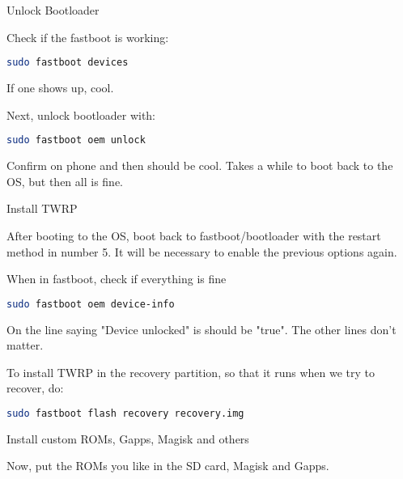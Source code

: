 \vspace{.5cm}
{\Large {} Unlock Bootloader}
\par Check if the fastboot is working:
\begin{lstlisting}[language=bash]
    sudo fastboot devices
\end{lstlisting}
\par If one shows up, cool. 

\par Next, unlock bootloader with:
\begin{lstlisting}[language=bash]
    sudo fastboot oem unlock
\end{lstlisting}

\par Confirm on phone and then should be cool. Takes a while to boot back to the OS, but then all is fine.

\vspace{.5cm}
{\Large {} Install TWRP}
\par After booting to the OS, boot back to fastboot/bootloader with the restart method in number 5. It will be necessary to enable the previous options again.
\par When in fastboot, check if everything is fine

\begin{lstlisting}[language=bash]
    sudo fastboot oem device-info
\end{lstlisting}
\par On the line saying "Device unlocked" is should be "true". The other lines don't matter.

\par To install TWRP in the recovery partition, so that it runs when we try to recover, do:
\begin{lstlisting}[language=bash]
    sudo fastboot flash recovery recovery.img
\end{lstlisting}


\vspace{.5cm}
{\Large {} Install custom ROMs, Gapps, Magisk and others}
\par Now, put the ROMs you like in the SD card, Magisk and Gapps. 

